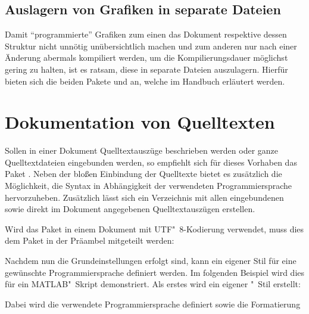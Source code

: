 \documentclass[%
  english,ngerman,%
  geometry=no,DIV=12,automark,%
]{tudscrartcl}
\begin{document}
\subsection{Auslagern von Grafiken in separate Dateien}
Damit \enquote{programmierte} Grafiken zum einen das Dokument respektive dessen 
Struktur nicht unnötig unübersichtlich machen und zum anderen nur nach einer 
Änderung abermals kompiliert werden, um die Kompilierungsdauer möglichst gering 
zu halten, ist es ratsam, diese in separate Dateien auszulagern. Hierfür bieten 
sich die beiden Pakete  und  an, welche 
im Handbuch erläutert werden.



\section{Dokumentation von Quelltexten}
Sollen in einer Dokument Quelltextauszüge beschrieben werden oder ganze 
Quelltextdateien eingebunden werden, so empfiehlt sich für dieses Vorhaben das 
Paket . Neben der bloßen Einbindung der Quelltexte bietet es 
zusätzlich die Möglichkeit, die Syntax in Abhängigkeit der verwendeten 
Programmiersprache hervorzuheben. Zusätzlich lässt sich ein Verzeichnis mit 
allen eingebundenen sowie direkt im Dokument angegebenen Quelltextauszügen 
erstellen.
%
\begin{Hint}
\usepackage{listings}
\end{Hint}
%
Wird das Paket in einem Dokument mit UTF"~8-Kodierung verwendet, muss dies dem 
Paket in der Präambel mitgeteilt werden:
%
\begin{Hint}
\end{Hint}
%
Nachdem nun die Grundeinstellungen erfolgt sind, kann ein eigener Stil für eine 
gewünschte Programmiersprache definiert werden. Im folgenden Beispiel wird dies 
für ein MATLAB"~Skript demonstriert. Als erstes wird  ein 
eigener "~Stil erstellt:
%
\begin{Hint*}
\end{Hint*}
%
Dabei wird die verwendete Programmiersprache definiert sowie die Formatierung 
\end{document}
